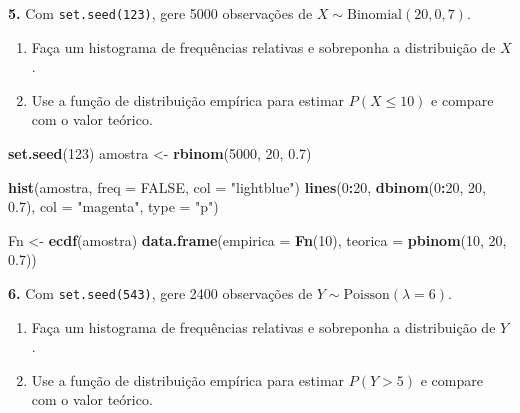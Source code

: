\documentclass[
  portuguese,
  11pt,
  openany]{book}
\newenvironment{Shaded}{\begin{snugshade}}{\end{snugshade}}
\newcommand{\AttributeTok}[1]{\textcolor[rgb]{0.13,0.29,0.53}{#1}}
\newcommand{\ConstantTok}[1]{\textcolor[rgb]{0.56,0.35,0.01}{#1}}
\newcommand{\DecValTok}[1]{\textcolor[rgb]{0.00,0.00,0.81}{#1}}
\newcommand{\FloatTok}[1]{\textcolor[rgb]{0.00,0.00,0.81}{#1}}
\newcommand{\FunctionTok}[1]{\textcolor[rgb]{0.13,0.29,0.53}{\textbf{#1}}}
\newcommand{\NormalTok}[1]{#1}
\newcommand{\OtherTok}[1]{\textcolor[rgb]{0.56,0.35,0.01}{#1}}
\newcommand{\SpecialCharTok}[1]{\textcolor[rgb]{0.81,0.36,0.00}{\textbf{#1}}}
\newcommand{\StringTok}[1]{\textcolor[rgb]{0.31,0.60,0.02}{#1}}
\providecommand{\tightlist}{%
  \setlength{\itemsep}{0pt}\setlength{\parskip}{0pt}}
\begin{document}
\textbf{5.} Com \texttt{set.seed(123)}, gere 5000 observações de \(X \sim \text{Binomial}(20, 0{,}7)\).

\begin{enumerate}
\def\labelenumi{(\alph{enumi})}
\tightlist
\item
  Faça um histograma de frequências relativas e sobreponha a distribuição de \(X\).
\item
  Use a função de distribuição empírica para estimar \(P(X \leq 10)\) e compare com o
  valor teórico.
\end{enumerate}

\begin{Shaded}
\begin{Highlighting}[]
\FunctionTok{set.seed}\NormalTok{(}\DecValTok{123}\NormalTok{)}
\NormalTok{amostra }\OtherTok{\textless{}{-}} \FunctionTok{rbinom}\NormalTok{(}\DecValTok{5000}\NormalTok{, }\DecValTok{20}\NormalTok{, }\FloatTok{0.7}\NormalTok{)}

\FunctionTok{hist}\NormalTok{(amostra, }\AttributeTok{freq =} \ConstantTok{FALSE}\NormalTok{, }\AttributeTok{col =} \StringTok{"lightblue"}\NormalTok{)}
\FunctionTok{lines}\NormalTok{(}\DecValTok{0}\SpecialCharTok{:}\DecValTok{20}\NormalTok{, }\FunctionTok{dbinom}\NormalTok{(}\DecValTok{0}\SpecialCharTok{:}\DecValTok{20}\NormalTok{, }\DecValTok{20}\NormalTok{, }\FloatTok{0.7}\NormalTok{), }\AttributeTok{col =} \StringTok{"magenta"}\NormalTok{, }\AttributeTok{type =} \StringTok{"p"}\NormalTok{)}

\NormalTok{Fn }\OtherTok{\textless{}{-}} \FunctionTok{ecdf}\NormalTok{(amostra)}
\FunctionTok{data.frame}\NormalTok{(}\AttributeTok{empirica =} \FunctionTok{Fn}\NormalTok{(}\DecValTok{10}\NormalTok{), }\AttributeTok{teorica =} \FunctionTok{pbinom}\NormalTok{(}\DecValTok{10}\NormalTok{, }\DecValTok{20}\NormalTok{, }\FloatTok{0.7}\NormalTok{))}
\end{Highlighting}
\end{Shaded}

\textbf{6.} Com \texttt{set.seed(543)}, gere 2400 observações de \(Y \sim \text{Poisson}(\lambda = 6)\).

\begin{enumerate}
\def\labelenumi{(\alph{enumi})}
\tightlist
\item
  Faça um histograma de frequências relativas e sobreponha a distribuição de \(Y\).
\item
  Use a função de distribuição empírica para estimar \(P(Y > 5)\) e compare com o valor
  teórico.
\end{enumerate}
\end{document}
